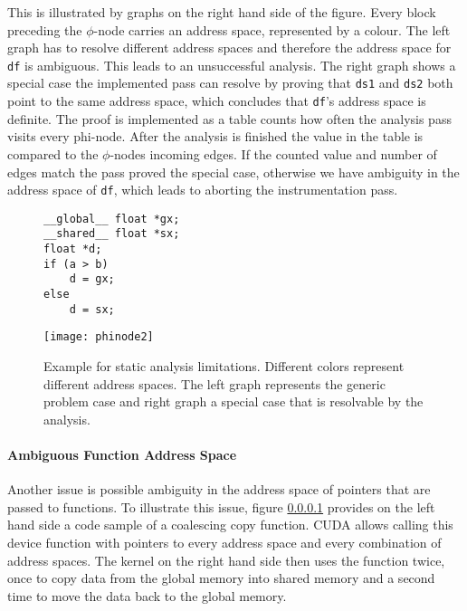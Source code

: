 This is illustrated by graphs on the right hand side of the figure. Every block preceding the $\phi$-node carries an address space, represented by a colour.
The left graph has to resolve different address spaces and therefore the address space for \verb|df| is ambiguous. This leads to an unsuccessful analysis. The right graph shows a special case the implemented pass can resolve by proving that \verb|ds1| and \verb|ds2| both point to the same address space, which concludes that \verb|df|'s address space is definite. The proof is implemented as a table counts how often the analysis pass visits every phi-node. After the analysis is finished the value in the table is compared to the $\phi$-nodes incoming edges. If the counted value and number of edges match the pass proved the special case, otherwise we have ambiguity in the address space of \verb|df|, which leads to aborting the instrumentation pass.

\begin{figure}[t]
		\begin{minipage}{0.35\textwidth}

		\begin{lstlisting}[style=c]
__global__ float *gx;
__shared__ float *sx;
float *d;
if (a > b)
	d = gx;
else 
	d = sx;	\end{lstlisting}
			\end{minipage}\hfill
	\begin{minipage}{0.6\textwidth}
		\centering
		\texttt{[image: phinode2]}
	\end{minipage}\hfill
	\caption{Example for static analysis limitations. Different colors represent different address spaces. The left graph represents the generic problem case and right graph a special case that is resolvable by the analysis.}
	\label{phinodes}
\end{figure}

\paragraph{Ambiguous Function Address Space}\label{func-vers}
Another issue is possible ambiguity in the address space of pointers that are passed to functions. To illustrate this issue, figure \ref{func-vers} provides on the left hand side a code sample of a coalescing copy function. CUDA allows calling this device function with pointers to every address space and every combination of address spaces. The kernel on the right hand side then uses the function twice, once to copy data from the global memory into shared memory and a second time to move the data back to the global memory.


